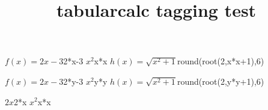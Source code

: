 \documentclass{article}
\title{tabularcalc tagging test}
\begin{document}
              {$f(x)=2x-3$}{2*x-3}
              {$x^2$}{x*x}
              {$h(x)=\sqrt{x^2+1}$}{round(root(2,x*x+1),6)}

\bigskip

              {$f(x)=2x-3$}{2*y-3}
              {$x^2$}{y*y}
              {$h(x)=\sqrt{x^2+1}$}{round(root(2,y*y+1),6)}

\bigskip

              {$2x$}{2*x}
              {$x^2$}{x*x}
\end{document}
